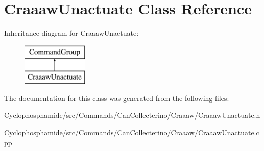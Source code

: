 \hypertarget{class_craaaw_unactuate}{}\section{Craaaw\+Unactuate Class Reference}
\label{class_craaaw_unactuate}
Inheritance diagram for Craaaw\+Unactuate\+:\begin{figure}[H]
\begin{center}
\leavevmode
\includegraphics[height=2.000000cm]{class_craaaw_unactuate}
\end{center}
\end{figure}


The documentation for this class was generated from the following files\+:\begin{DoxyCompactItemize}
\item 
Cyclophosphamide/src/\+Commands/\+Can\+Collecterino/\+Craaaw/Craaaw\+Unactuate.\+h\item 
Cyclophosphamide/src/\+Commands/\+Can\+Collecterino/\+Craaaw/Craaaw\+Unactuate.\+cpp\end{DoxyCompactItemize}

